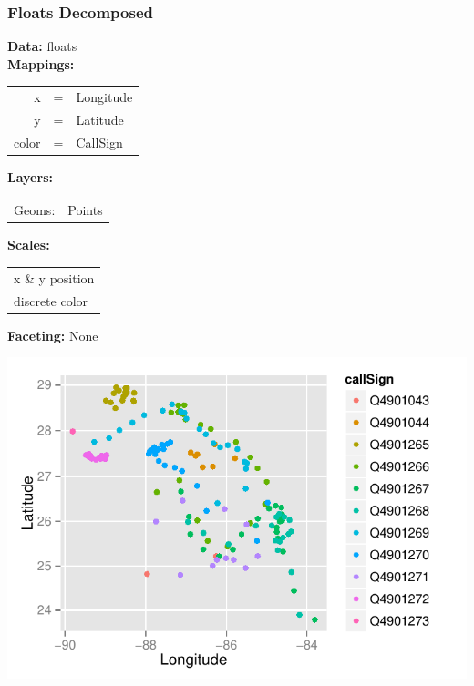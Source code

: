 \documentclass{beamer}\usepackage[]{graphicx}\usepackage[]{color}
\begin{document}
\begin{frame}[fragile]
\frametitle{Floats Decomposed}
\begin{minipage}{.35\linewidth}
\textbf{Data:} floats \\
\textbf{Mappings:}
\footnotesize

\begin{tabular}{rcl}
x&=&Longitude \\
y&=&Latitude\\
color&=&CallSign\\
\end{tabular}\normalsize

\textbf{Layers:} 
\footnotesize

\begin{tabular}{rl}
Geoms: & Points\\
\end{tabular}
\normalsize

\textbf{Scales:} 
\footnotesize

\begin{tabular}{l}
x \& y position\\
discrete color
\end{tabular}
\normalsize

\textbf{Faceting:} None
\end{minipage}
\begin{minipage}{.6\linewidth}\centering
\includegraphics[keepaspectratio=TRUE,width=.92\linewidth]{figure/kfloats3}
\end{minipage}
\end{frame}

\end{document}
